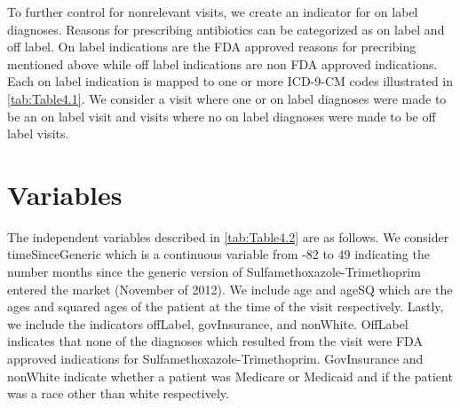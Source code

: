 \indent To further control for nonrelevant visits, we create an indicator for on label diagnoses. Reasons for prescribing antibiotics can be categorized as on label and off label. On label indications are the FDA approved reasons for precribing mentioned above while off label indications are non FDA approved indications. Each on label indication is mapped to one or more ICD-9-CM codes illustrated in \autoref{tab:Table4.1}. We consider a visit where one or on label diagnoses were made to be an on label visit and visits where no on label diagnoses were made to be off label visits. 

\section{Variables}
The independent variables described in \autoref{tab:Table4.2} are as follows. We consider timeSinceGeneric which is a continuous variable from -82 to 49 indicating the number months since the generic version of Sulfamethoxazole-Trimethoprim entered the market (November of 2012). We include age and ageSQ which are the ages and squared ages of the patient at the time of the visit respectively. Lastly, we include the indicators offLabel, govInsurance, and nonWhite. OffLabel indicates that none of the diagnoses which resulted from the visit were FDA approved indications for Sulfamethoxazole-Trimethoprim. GovInsurance and nonWhite indicate whether a patient was Medicare or Medicaid and if the patient was a race other than white respectively.\\
\begin{landscape}



\end{landscape}
